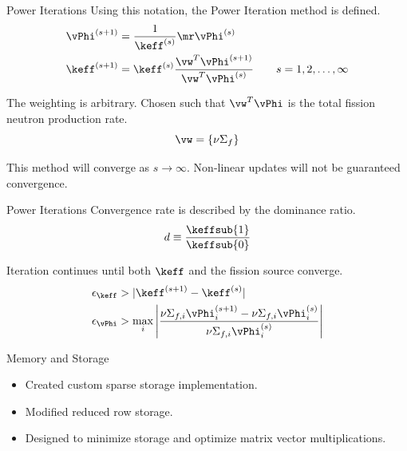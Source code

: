 \begin{frame}{Power Iterations}
  Using this notation, the Power Iteration method is defined.
  \begin{align}
    \label{eq:power_iteration_phi}
    \vPhi^{(s+1)} &= \frac{1}{\keff^{(s)}} \mr \vPhi^{(s)} \\
    \label{eq:power_iteration_eigenvalue}
    \keff^{(s+1)} &= \keff^{(s)} \frac{\vw^{T} \vPhi^{(s+1)}}
      {\vw^{T} \vPhi^{(s)}} \qquad s = 1,2,\ldots,\infty
  \end{align}

  The weighting is arbitrary. Chosen such that $\vw^{T} \vPhi$ is the total 
  fission neutron production rate.
  \begin{equation}
    \vw = \{\nu \Sigma_f \}
  \end{equation}

  This method will converge as $s \rightarrow \infty$. Non-linear updates will
  not be guaranteed convergence.
\end{frame}

\begin{frame}{Power Iterations}
  Convergence rate is described by the dominance ratio.
  \begin{equation}
    d \equiv \frac{\keffsub{1}}{\keffsub{0}}
  \end{equation}

  Iteration continues until both $\keff$ and the fission source converge.
  \begin{align}
    \label{eq:eigenvalue_tol}
    \epsilon_{\keff} &> | \keff^{(s+1)} - \keff^{(s)} | \\
    \label{eq:eigenvector_tol}
    \epsilon_{\vPhi} &> \max_i \left| \frac{\nu\Sigma_{f,i}\vPhi_i^{(s+1)} - 
      \nu\Sigma_{f,i} \vPhi_i^{(s)}}
      {\nu\Sigma_{f,i} \vPhi_i^{(s)}}\right|
  \end{align}
\end{frame}

\begin{frame}{Memory and Storage}
  \begin{itemize}
    \item Created custom \twotable sparse storage implementation.
    \item Modified reduced row storage.
    \item Designed to minimize storage and optimize matrix vector
      multiplications.
  \end{itemize}
\end{frame}

